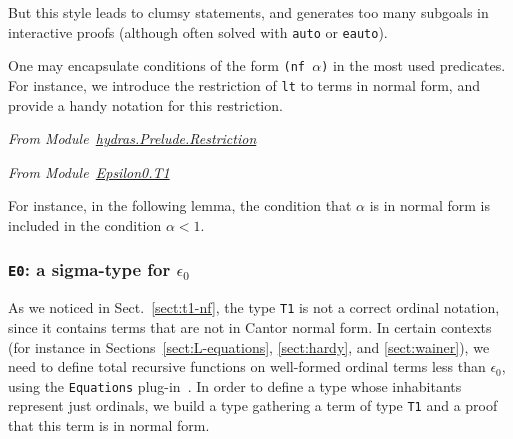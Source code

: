 

\vspace{4pt}


But this style leads to clumsy statements, and generates too many subgoals in interactive proofs (although often solved with \texttt{auto} or \texttt{eauto}).

One may encapsulate conditions of the form \texttt{(nf $\alpha$)} in
the most used predicates. For instance, we introduce the restriction of \texttt{lt} to terms in normal form, and provide a handy notation for this restriction.

\vspace{4pt}
\emph{From Module~\href{../theories/html/hydras.Prelude.Restriction.html}{hydras.Prelude.Restriction}}



\vspace{4pt}
\emph{From Module~\href{../theories/html/hydras.Epsilon0.T1.html\#LT}{Epsilon0.T1}}



\label{Predicates:LT-T1}
 

For instance, in the following lemma, the condition that $\alpha$ is in normal form is included in the condition $\alpha< 1$.




\subsubsection{\texttt{E0}: a sigma-type for \texorpdfstring{$\epsilon_0$}{epsilon0}}

As we noticed in Sect.~\ref{sect:t1-nf}, the type \texttt{T1} is not a correct ordinal notation, since it contains terms that are not in Cantor normal form. In certain contexts (for instance in Sections~\ref{sect:L-equations}, \ref{sect:hardy},
and \ref{sect:wainer}),  we need to define total recursive functions on well-formed ordinal terms less  than $\epsilon_0$, using the \texttt{Equations} plug-in~\cite{sozeau:hal-01671777}.
 In order to define a type whose inhabitants represent just ordinals, we build a type gathering a term of type \texttt{T1} and a proof that this term is in normal form.

 

 

\label{sect:E0-def}
\label{types:E0}


